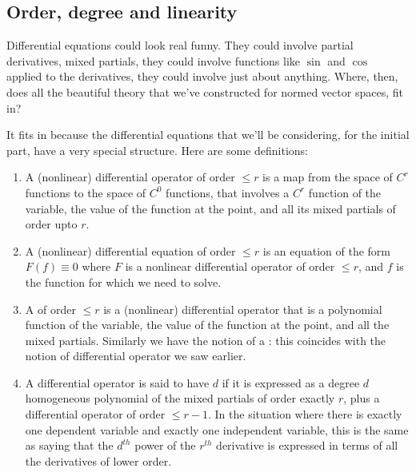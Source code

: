 \documentclass[a4paper]{amsart}
\begin{document}
\subsection{Order, degree and linearity}

Differential equations could look real funny. They could involve
partial derivatives, mixed partials, they could involve functions like
$\sin$ and $\cos$ applied to the derivatives, they could involve just
about anything. Where, then, does all the beautiful theory that we've
constructed for normed vector spaces, fit in?

It fits in because the differential equations that we'll be
considering, for the initial part, have a very special structure. Here
are some definitions:

\begin{definer}

  \begin{enumerate}

  \item A (nonlinear) differential operator of order $\le r$ is a map
    from the space of $C^r$ functions to the space of $C^0$ functions,
    that involves a $C^r$ function of the variable, the value of the
    function at the point, and all its mixed partials of order upto $r$.

  \item A (nonlinear) differential equation of order $\le r$ is an
    equation of the form $F(f) \equiv 0$ where $F$ is a nonlinear
    differential operator of order $\le r$, and $f$ is the function for which we need to solve.

  \item A  of order $\le
    r$ is a (nonlinear) differential operator that is a polynomial
    function of the variable, the value of the function at the point,
    and all the mixed partials. Similarly we have the notion of a
    : this coincides with the
    notion of differential operator we saw earlier.

  \item A differential operator is said to have 
    $d$ if it is expressed as a degree $d$ homogeneous polynomial of
    the mixed partials of order exactly $r$, plus a differential
    operator of order $\le r - 1$. In the situation where there is
    exactly one dependent variable and exactly one independent
    variable, this is the same as saying that the $d^{th}$ power of
    the $r^{th}$ derivative is expressed in terms of all the derivatives of lower order.
    
  \end{enumerate}
\end{definer}
\end{document}
